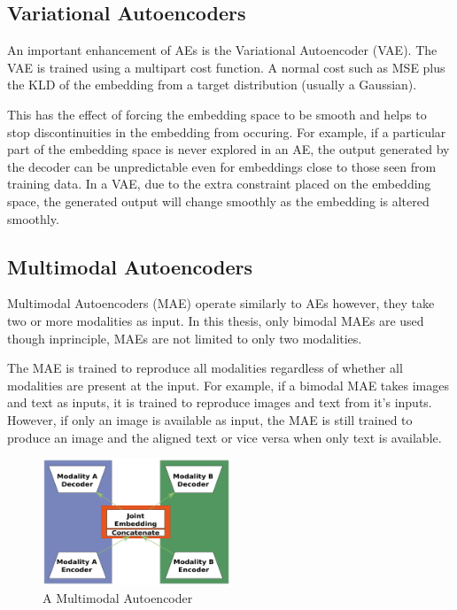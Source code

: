 \subsection{Variational Autoencoders}
An important enhancement of AEs is the Variational Autoencoder (VAE). The VAE is trained using a multipart cost function. A normal cost such as MSE plus the KLD of the embedding from a target distribution (usually a Gaussian).

This has the effect of forcing the embedding space to be smooth and helps to stop discontinuities in the embedding from occuring. For example, if a particular part of the embedding space is never explored in an AE, the output generated by the decoder can be unpredictable even for embeddings close to those seen from training data. In a VAE, due to the extra constraint placed on the embedding space, the generated output will change smoothly as the embedding is altered smoothly.


\subsection{Multimodal Autoencoders}
Multimodal Autoencoders (MAE) operate similarly to AEs however, they take two or more modalities as input. In this thesis, only bimodal MAEs are used though inprinciple, MAEs are not limited to only two modalities.

The MAE is trained to reproduce all modalities regardless of whether all modalities are present at the input. For example, if a bimodal MAE takes images and text as inputs, it is trained to reproduce images and text from it's inputs. However, if only an image is available as input, the MAE is still trained to produce an image and the aligned text or vice versa when only text is available.


\begin{figure}
	\centering
	\includegraphics[width=0.5\textwidth]{Figs/intro2dl/MAE.png}
	
	\caption{A Multimodal Autoencoder}
	\label{fig:mae}
\end{figure}

